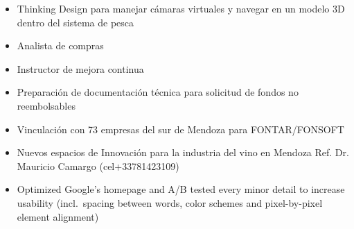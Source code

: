 \documentclass[10pt,a4paper,ragged2e,withhyper]{altacv}
\begin{document}
\begin{paracol}{2}


\begin{itemize}
\item  Thinking Design para manejar cámaras virtuales y navegar en un modelo 3D dentro del sistema de pesca

\item Analista de compras
\item Instructor de mejora continua
\end{itemize}

\divider

\begin{itemize}
\item Preparación de documentación técnica para solicitud de fondos no reembolsables
\item Vinculación con 73 empresas del sur de Mendoza para FONTAR/FONSOFT
\end{itemize}

\divider


\divider


\begin{itemize}
\item Nuevos espacios de Innovación para la industria del vino en Mendoza Ref.  Dr. Mauricio Camargo (cel+33781423109)
\item Optimized Google's homepage and A/B tested every minor detail to increase usability (incl.~spacing between words, color schemes and pixel-by-pixel element alignment)
\end{itemize}





\end{paracol}
\end{document}
